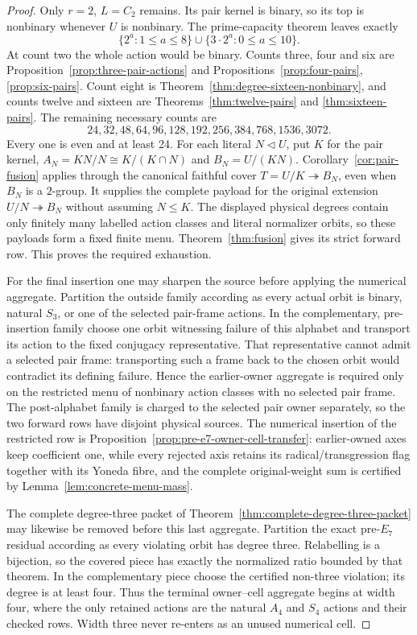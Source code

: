 \begin{proof}
Only $r=2$, $L=C_2$ remains. Its pair kernel is binary, so its
top is nonbinary whenever $U$ is nonbinary. The prime-capacity
theorem leaves exactly
\[
 \{2^a:1\leq a\leq8\}\cup
 \{3\cdot2^a:0\leq a\leq10\}.
\]
At count two the whole action would be binary. Counts three,
four and six are Proposition~\ref{prop:three-pair-actions} and
Propositions~\ref{prop:four-pairs}, \ref{prop:six-pairs}.
Count eight is Theorem~\ref{thm:degree-sixteen-nonbinary}, and
counts twelve and sixteen are Theorems~\ref{thm:twelve-pairs}
and \ref{thm:sixteen-pairs}. The remaining necessary counts are
\[
 24,32,48,64,96,128,192,256,384,768,1536,3072.
\]
Every one is even and at least 24. For each literal $N\lhd U$, put
$K$ for the pair kernel, $A_N=KN/N\cong K/(K\cap N)$ and
$B_N=U/(KN)$. Corollary~\ref{cor:pair-fusion} applies through the
canonical faithful cover $T=U/K\twoheadrightarrow B_N$, even when
$B_N$ is a $2$-group. It supplies the complete payload for the original
extension $U/N\twoheadrightarrow B_N$ without assuming $N\leq K$.
The displayed physical degrees contain only finitely many labelled action
classes and literal normalizer orbits, so these payloads form a fixed
finite menu. Theorem~\ref{thm:fusion} gives its strict forward row.
This proves the required exhaustion.

For the final insertion one may sharpen the source before applying the
numerical aggregate.  Partition the outside family according as every actual
orbit is binary, natural $S_3$, or one of the selected pair-frame actions.
In the complementary, pre-insertion family choose one orbit witnessing
failure of this alphabet and transport its action to the fixed conjugacy
representative.  That representative cannot admit a selected pair frame:
transporting such a frame back to the chosen orbit would contradict its
defining failure.  Hence the earlier-owner aggregate is required only on the
restricted menu of nonbinary action classes with no selected pair frame.
The post-alphabet family is charged to the selected pair owner separately,
so the two forward rows have disjoint physical sources.  The numerical
insertion of the restricted row is
Proposition~\ref{prop:pre-e7-owner-cell-transfer}: earlier-owned axes keep
coefficient one, while every rejected axis retains its radical/transgression
flag together with its Yoneda fibre, and the complete original-weight sum is
certified by Lemma~\ref{lem:concrete-menu-mass}.

The complete degree-three packet of
Theorem~\ref{thm:complete-degree-three-packet} may likewise be removed before
this last aggregate.  Partition the exact pre-$E_7$ residual according as
every violating orbit has degree three.  Relabelling is a bijection, so the
covered piece has exactly the normalized ratio bounded by that theorem.  In
the complementary piece choose the certified non-three violation; its degree
is at least four.  Thus the terminal owner--cell aggregate begins at width
four, where the only retained actions are the natural $A_4$ and $S_4$ actions
and their checked rows.  Width three never re-enters as an unused numerical
cell.


\end{proof}
